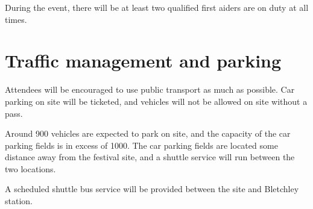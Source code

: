 During the event, there will be at least two qualified first aiders are on duty at all times.

\section{Traffic management and parking}

Attendees will be encouraged to use public transport as much as possible. Car parking on site will be ticketed,
and vehicles will not be allowed on site without a pass.

Around 900 vehicles are expected to park on site, and the capacity of the car parking fields is in excess of 1000.
The car parking fields are located some distance away from the festival site, and a shuttle service will run between
the two locations.

A scheduled shuttle bus service will be provided between the site and Bletchley station.

